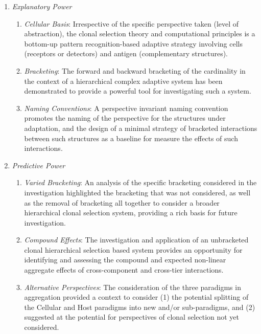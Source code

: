\begin{enumerate}
	\item \emph{Explanatory Power}
	\begin{enumerate}
		\item \emph{Cellular Basis}: Irrespective of the specific perspective taken (level of abstraction), the clonal selection theory and computational principles is a bottom-up pattern recognition-based adaptive strategy involving cells (receptors or detectors) and antigen (complementary structures).		
		\item \emph{Bracketing}: The forward and backward bracketing of the cardinality in the context of a hierarchical complex adaptive system has been demonstrated to provide a powerful tool for investigating such a system.
		\item \emph{Naming Conventions}: A perspective invariant naming convention promotes the naming of the perspective for the structures under adaptation, and the design of a minimal strategy of bracketed interactions between such structures as a baseline for measure the effects of such interactions.		
	\end{enumerate}
	
	\item \emph{Predictive Power}
	\begin{enumerate}
		\item \emph{Varied Bracketing}: An analysis of the specific bracketing considered in the investigation highlighted the bracketing that was not considered, as well as the removal of bracketing all together to consider a broader hierarchical clonal selection system, providing a rich basis for future investigation.
		\item \emph{Compound Effects}: The investigation and application of an unbracketed clonal hierarchical selection based system provides an opportunity for identifying and assessing the compound and expected non-linear aggregate effects of cross-component and cross-tier interactions. 
		\item \emph{Alternative Perspectives}: The consideration of the three paradigms in aggregation provided a context to consider (1) the potential splitting of the Cellular and Host paradigms into new and/or sub-paradigms, and (2) suggested at the potential for perspectives of clonal selection not yet considered.
	\end{enumerate}	
\end{enumerate}


%
%
